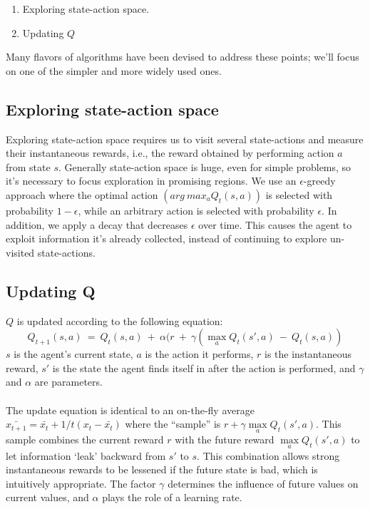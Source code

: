 \documentclass[12pt]{article}
\begin{document}
\begin{enumerate}
\item Exploring state-action space.
\item Updating $Q$
\end{enumerate}
Many flavors of algorithms have been devised to address these points; we’ll focus on one of the simpler and more widely used ones.

\subsection{Exploring state-action space}

Exploring state-action space requires us to visit several state-actions and measure their instantaneous rewards, i.e., the reward obtained by performing action $a$ from state $s$. Generally state-action space is huge, even for simple problems, so it’s necessary to focus exploration in promising regions. We use an $\epsilon$-greedy approach where the optimal action $(arg \ max_a Q_t(s,a))$ is selected with probability $1−\epsilon$, while an arbitrary action is selected with probability $\epsilon$. In addition, we apply a decay that decreases $\epsilon$ over time. This causes the agent to exploit information it’s already collected, instead of continuing to explore un-visited state-actions.

\subsection{Updating Q}

$Q$ is updated according to the following equation:
\begin{equation*}
 Q_{t+1}(s,a) \ = \ Q_t(s,a) \ + \ \alpha(r \ + \ \gamma(\underset{a}{\max}Q_t(s',a) \ - \ Q_t(s,a))   
\end{equation*}
$s$ is the agent’s current state, $a$ is the action it performs, $r$ is the instantaneous reward, $s'$ is the state the agent finds itself in after the action is performed, and $\gamma$ and $\alpha$ are parameters.\\  \\
The update equation is identical to an on-the-fly average $\bar{x_{t+1}} = \bar{x_t}+1/t(x_t  - \bar{x_t})$ where the “sample” is $r+\gamma\underset{a}{\max}Q_t(s',a)$. This sample combines the current reward $r$ with the future reward $\underset{a}{\max}Q_t(s',a)$ to let information ‘leak’ backward from $s'$ to $s$. This combination allows strong instantaneous rewards to be lessened if the future state is bad, which is intuitively appropriate. The factor $\gamma$ determines the influence of future values on current values, and $\alpha$ plays the role of a learning rate.
\end{document}

